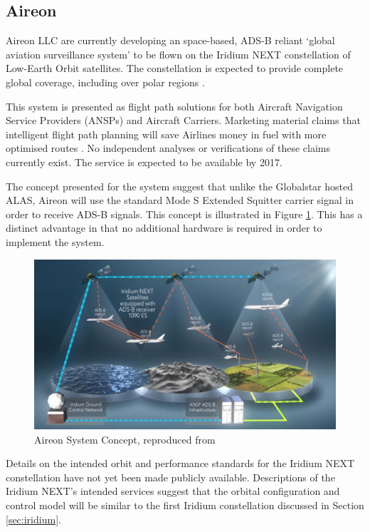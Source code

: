 \subsection{Aireon} \label{sec:aireon}
Aireon LLC are currently developing an space-based, ADS-B reliant `global aviation surveillance system' \cite{ADS-B:Aireon_brochure} to be flown on the Iridium NEXT constellation of Low-Earth Orbit satellites. The constellation is expected to provide complete global coverage, including over polar regions \cite{ADS-B:Aireon_comparison}.   

This system is presented as flight path solutions for both Aircraft Navigation Service Providers (ANSPs) and Aircraft Carriers. Marketing material claims that intelligent flight path planning will save Airlines money in fuel with more optimised routes \cite{ADS-B:Aireon_comparison}. No independent analyses or verifications of these claims currently exist. The service is expected to be available by 2017.

The concept presented for the system suggest that unlike the Globalstar hosted ALAS, Aireon will use the standard Mode S Extended Squitter carrier signal in order to receive ADS-B signals\cite{Dawson2013}. This concept is illustrated in Figure \ref{fig:aireon_concept}. This has a distinct advantage in that no additional hardware is required in order to implement the system. 

\begin{figure}[htbp]
	\centering
	\includegraphics[scale = 0.55]{Pictures/aireon_concept.png}
	
	\caption[Aireon System Concept]{Aireon System Concept, reproduced from \cite{Dawson2013}}
	\label{fig:aireon_concept}
	\end{figure}

Details on the intended orbit and performance standards for the Iridium NEXT constellation have not yet been made publicly available. Descriptions of the Iridium NEXT's intended services \cite{ADS-B:Aireon_brochure} suggest that the orbital configuration and control model will be similar to the first Iridium constellation discussed in Section \ref{sec:iridium}. 

